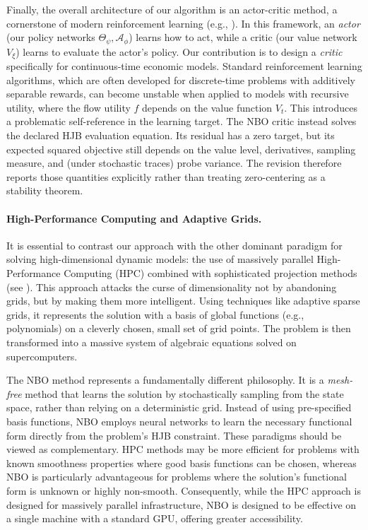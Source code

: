 \documentclass[ecta]{econsocart}
\theoremstyle{plain}
\theoremstyle{remark}
\begin{document}
Finally, the overall architecture of our algorithm is an actor-critic method, a cornerstone of modern reinforcement learning (e.g., \cite{sutton2018reinforcement}). In this framework, an \textit{actor} (our policy networks $\Theta_\psi, \mathcal{A}_\phi$) learns how to act, while a critic (our value network $V_\xi$) learns to evaluate the actor's policy. Our contribution is to design a \textit{critic} specifically for continuous-time economic models. Standard reinforcement learning algorithms, which are often developed for discrete-time problems with additively separable rewards, can become unstable when applied to models with recursive utility, where the flow utility $f$ depends on the value function $V_t$. This introduces a problematic self-reference in the learning target. The NBO critic instead solves the declared HJB evaluation equation. Its residual has a zero target, but its expected squared objective still depends on the value level, derivatives, sampling measure, and (under stochastic traces) probe variance. The revision therefore reports those quantities explicitly rather than treating zero-centering as a stability theorem.


\paragraph*{High-Performance Computing and Adaptive Grids.} It is essential to contrast our approach with the other dominant paradigm for solving high-dimensional dynamic models: the use of massively parallel High-Performance Computing (HPC) combined with sophisticated projection methods (see \cite{brumm2017using}). This approach attacks the curse of dimensionality not by abandoning grids, but by making them more intelligent. Using techniques like adaptive sparse grids, it represents the solution with a basis of global functions (e.g., polynomials) on a cleverly chosen, small set of grid points. The problem is then transformed into a massive system of algebraic equations solved on supercomputers.

The NBO method represents a fundamentally different philosophy. It is a \textit{mesh-free} method that learns the solution by stochastically sampling from the state space, rather than relying on a deterministic grid. Instead of using pre-specified basis functions, NBO employs neural networks to learn the necessary functional form directly from the problem's HJB constraint. These paradigms should be viewed as complementary. HPC methods may be more efficient for problems with known smoothness properties where good basis functions can be chosen, whereas NBO is particularly advantageous for problems where the solution's functional form is unknown or highly non-smooth. Consequently, while the HPC approach is designed for massively parallel infrastructure, NBO is designed to be effective on a single machine with a standard GPU, offering greater accessibility.
\end{document}
